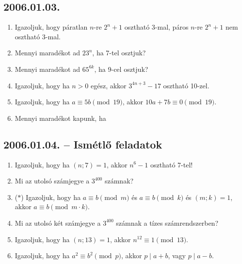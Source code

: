 \subsection*{2006.01.03.}
\begin{enumerate}
 
\item Igazoljuk, hogy páratlan $n$-re $2^n+1$ osztható 3-mal, páros $n$-re $2^n+1$ nem osztható 3-mal. 

\item Mennyi maradékot ad $23^n$, ha 7-tel osztjuk?

\item Mennyi maradékot ad $65^{6k}$, ha 9-cel osztjuk?

\item Igazoljuk, hogy ha $n>0$ egész, akkor $3^{4n+3}-17$ osztható 10-zel.

\item Igazoljuk, hogy ha $a \equiv 5b \pmod{19}$, akkor $10a+7b \equiv 0 \pmod{19}$.

\item Mennyi maradékot kapunk, ha 


\end{enumerate}

\subsection*{2006.01.04. -- Ismétlő feladatok}
\begin{enumerate}
\item Igazoljuk, hogy ha $(n;7)=1$, akkor $n^6-1$ osztható 7-tel!

\item Mi az utolsó számjegye a $3^{400}$ számnak?

\item ($*$) Igazoljuk, hogy ha $a\equiv b \pmod m$ és $a \equiv b \pmod k$ és $(m;k)=1$, akkor 
$a\equiv b \pmod {m \cdot k}$.

\item Mi az utolsó két számjegye a $3^{400}$ számnak a tízes számrendszerben?

\item Igazoljuk, hogy ha $(n;13)=1$, akkor $n^{12} \equiv 1 \pmod {13}$.

\item Igazoljuk, hogy ha $a^2 \equiv b^2 \pmod p$, akkor $p \mid a+b$, vagy $p \mid a-b$. 
\end{enumerate}

